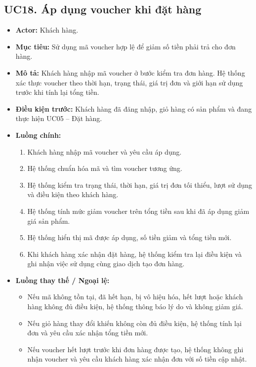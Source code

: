 \documentclass[12pt,a4paper]{article}
\begin{document}

\subsection{UC18. Áp dụng voucher khi đặt hàng}

\begin{itemize}
 \item \textbf{Actor:} Khách hàng.
 \item \textbf{Mục tiêu:} Sử dụng mã voucher hợp lệ để giảm số tiền phải trả cho đơn hàng.
 \item \textbf{Mô tả:} Khách hàng nhập mã voucher ở bước kiểm tra đơn hàng. Hệ thống xác thực voucher theo thời hạn, trạng thái, giá trị đơn và giới hạn sử dụng trước khi tính lại tổng tiền.
 \item \textbf{Điều kiện trước:} Khách hàng đã đăng nhập, giỏ hàng có sản phẩm và đang thực hiện UC05 -- Đặt hàng.
 \item \textbf{Luồng chính:}
 \begin{enumerate}
  \item Khách hàng nhập mã voucher và yêu cầu áp dụng.
  \item Hệ thống chuẩn hóa mã và tìm voucher tương ứng.
  \item Hệ thống kiểm tra trạng thái, thời hạn, giá trị đơn tối thiểu, lượt sử dụng và điều kiện theo khách hàng.
  \item Hệ thống tính mức giảm voucher trên tổng tiền sau khi đã áp dụng giảm giá sản phẩm.
  \item Hệ thống hiển thị mã được áp dụng, số tiền giảm và tổng tiền mới.
  \item Khi khách hàng xác nhận đặt hàng, hệ thống kiểm tra lại điều kiện và ghi nhận việc sử dụng cùng giao dịch tạo đơn hàng.
 \end{enumerate}
 \item \textbf{Luồng thay thế / Ngoại lệ:}
 \begin{itemize}
  \item Nếu mã không tồn tại, đã hết hạn, bị vô hiệu hóa, hết lượt hoặc khách hàng không đủ điều kiện, hệ thống thông báo lý do và không giảm giá.
  \item Nếu giỏ hàng thay đổi khiến không còn đủ điều kiện, hệ thống tính lại đơn và yêu cầu xác nhận tổng tiền mới.
  \item Nếu voucher hết lượt trước khi đơn hàng được tạo, hệ thống không ghi nhận voucher và yêu cầu khách hàng xác nhận đơn với số tiền cập nhật.

\end{itemize}
\end{itemize}
\end{document}
